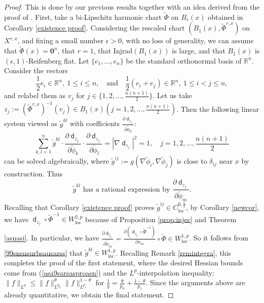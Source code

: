 \documentclass[11pt,reqno]{amsart}
\theoremstyle{definition}
\numberwithin{equation}{section}
\newcommand{\bo}{\bm{0}}
\newcommand{\dR}{\mathbb{R}}
\DeclareMathOperator{\dist}{\mathsf{d}}
\DeclareMathOperator{\loc}{loc}
\begin{document}
\begin{proof}
    This is done by our previous results together with an idea derived from the proof of \cite[proposition 1.2]{AC}.
    First, take a bi-Lipschitz harmonic chart $\widetilde{\Phi}$ on $B_r(x)$ obtained in Corollary \ref{existence proof}.
Considering the rescaled chart
$
    ( B_1(x), \widetilde \Phi^{r, x})$ on $X^{r, x}$,
and fixing a small number $\epsilon>0$,
with no loss of generality, we can assume that $\tilde \Phi(x)=\bo^n$, that $r=1$, that $\mathrm{Injrad}(B_1(x))$ is large, and that $B_1(x)$ is $(\epsilon, 1)$-Reifenberg flat. Let $\{e_1,\ldots, e_n\}$ be the standard orthonormal basis of $\dR^n$.
Consider the vectors
\begin{equation}
 \frac{1}{2}e_i\in\dR^n,\ 1\leq i\leq n,\quad \text{and}\quad  \frac{1}{2}(e_i+e_j) \in \mathbb{R}^n, \  1\leq i<j \leq n,
\end{equation} and relabel them as $v_j$ for $j \in \{1,2,\ldots, \frac{n (n + 1)}{2}\}$.
Let us take $z_j := (\widetilde{\Phi}^{r, x})^{-1}(v_j) \in B_1(x) (j=1,2,\ldots, \frac{n(n+1)}{2})$.
Then the following linear system viewed as $\tilde g^{kl}$ with coefficients $\frac{\partial \dist_{z_{j}}}{\partial \tilde \phi_{k}}$:
\begin{equation}
\sum_{k, l=1}^n\tilde g^{kl}\cdot \frac{\partial \dist_{z_{j}}}{\partial \tilde \phi_{k}}\cdot \frac{\partial \dist_{z_{j}}}{\partial \tilde \phi_{l}}=|\nabla \dist_{z_{j}}|^2=1,\quad j=1, 2, \ldots, \frac{n(n+1)}{2}
\end{equation}
can be solved algebraically, where $\tilde g^{ij} := g(\nabla \tilde \phi_i, \nabla \tilde \phi_j)$ is close to $\delta_{ij}$ near $x$ by construction.
Thus 
\begin{equation}\label{99snsnsurbsausarss}
\text{$\tilde g^{kl}$ has a rational expression by $\frac{\partial \dist_{z_{j}}}{\partial \tilde \phi_{m}}$.}    
\end{equation}
Recalling that Corollary \ref{existence proof} proves
$\tilde{g}^{ij}\in C^{0,\frac{1}{2}}_{\loc}$,  by Corollary \ref{newcor}, we have $\dist_{z_j}\circ \tilde \Phi^{-1} \in W^{2,p}_{\loc}$ because of Proposition \ref{prop:injec} and Theorem \ref{asnasi}. In particular, we have  $\frac{\partial \dist_{z_{j}}}{\partial \tilde \phi_{m}}=\frac{\partial (\dist_{z_j}\circ \tilde \Phi^{-1})}{\partial x_m}\circ \tilde \Phi \in W_{\loc}^{1,p}$. So it follows from \eqref{99snsnsurbsausarss}  that $\tilde g^{kl} \in W^{1,p}_{\loc}$. Recalling Remark \ref{remintegra},
this completes the proof of the first statement, where the desired Hessian bounds come from  (\ref{asa9sarsasproasn}) and the $L^p$-interpolation inequality:
$\|f\|_{L^q}\le \|f\|_{L^{p_0}}^{\theta}\|f\|_{L^{p_1}}^{1-\theta}$ for $\frac{1}{q}=\frac{\theta}{p_0}+\frac{1-\theta}{p_1}$.
Since the arguments above are already quantitative, we obtain the final statement.
\end{proof}
\end{document}

